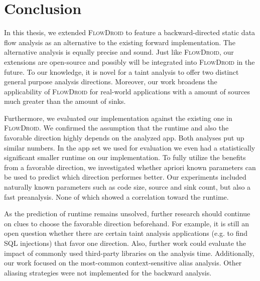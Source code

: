 \documentclass[../draft.tex]{subfiles}
\begin{document}
    \chapter{Conclusion}
    In this thesis, we extended \textsc{FlowDroid} to feature a backward-directed static data flow analysis as an alternative to the existing forward implementation.
    The alternative analysis is equally precise and sound.
    Just like \textsc{FlowDroid}, our extensions are open-source and possibly will be integrated into \textsc{FlowDroid} in the future.
    To our knowledge, it is novel for a taint analysis to offer two distinct general purpose analysis directions.
    Moreover, our work broadens the applicability of \textsc{FlowDroid} for real-world applications with a amount of sources much greater than the amount of sinks.

    Furthermore, we evaluated our implementation against the existing one in \textsc{FlowDroid}.
    We confirmed the assumption that the runtime and also the favorable direction highly depends on the analyzed app.
    Both analyses put up similar numbers.
    In the app set we used for evaluation we even had a statistically significant smaller runtime on our implementation.
    To fully utilize the benefits from a favorable direction, we investigated whether apriori known parameters can be used to predict which direction performes better.
    Our experiments included naturally known parameters such as code size, source and sink count, but also a fast preanalysis.
    None of which showed a correlation toward the runtime.

    As the prediction of runtime remains unsolved, further research should continue on clues to choose the favorable direction beforehand.
    For example, it is still an open question whether there are certain taint analysis applications (e.g. to find SQL injections) that favor one direction.
    Also, further work could evaluate the impact of commonly used third-party libraries on the analysis time.
    Additionally, our work focused on the most-common context-sensitive alias analysis.
    Other aliasing strategies were not implemented for the backward analysis.
\end{document}
